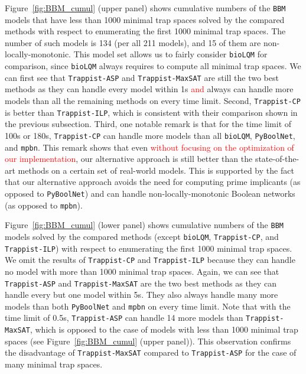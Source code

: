 \documentclass[preprint,12pt]{elsarticle}
\newcommand{\change}[1]{\textcolor{red}{#1}}
\begin{document}
Figure~\ref{fig:BBM_cumul} (upper panel) shows cumulative numbers of the \texttt{BBM} models that have less than 1000 minimal trap spaces solved by the compared methods with respect to enumerating the first 1000 minimal trap spaces.
The number of such models is 134 (per all 211 models), and 15 of them are non-locally-monotonic.
This model set allows us to fairly consider \texttt{bioLQM} for comparison, since \texttt{bioLQM} always requires to compute all minimal trap spaces.
We can first see that \texttt{Trappist-ASP} and \texttt{Trappist-MaxSAT} are still the two best methods as they can handle every model within 1s \change{and} always can handle more models than all the remaining methods on every time limit.
Second, \texttt{Trappist-CP} is better than \texttt{Trappist-ILP}, which is consistent with their comparison shown in the previous subsection.
Third, one notable remark is that for the time limit of 100s or 180s, \texttt{Trappist-CP} can handle more models than all \texttt{bioLQM}, \texttt{PyBoolNet}, and \texttt{mpbn}.
This remark shows that even \change{without focusing on the optimization of our implementation}, our alternative approach is still better than the state-of-the-art methods on a certain set of real-world models.
This is supported by the fact that our alternative approach avoids the need for computing prime implicants (as opposed to \texttt{PyBoolNet}) and can handle non-locally-monotonic Boolean networks (as opposed to \texttt{mpbn}).


Figure~\ref{fig:BBM_cumul} (lower panel) shows cumulative numbers of the \texttt{BBM} models solved by the compared methods (except \texttt{bioLQM}, \texttt{Trappist-CP}, and \texttt{Trappist-ILP}) with respect to enumerating the first 1000 minimal trap spaces.
We omit the results of \texttt{Trappist-CP} and \texttt{Trappist-ILP} because they can handle no model with more than 1000 minimal trap spaces.
Again, we can see that \texttt{Trappist-ASP} and \texttt{Trappist-MaxSAT} are the two best methods as they can handle every but one model within 5s. They also always handle many more models than both \texttt{PyBoolNet} and \texttt{mpbn} on every time limit.
Note that with the time limit of 0.5s, \texttt{Trappist-ASP} can handle 14 more models than \texttt{Trappist-MaxSAT}, which is opposed to the case of models with less than 1000 minimal trap spaces (see Figure~\ref{fig:BBM_cumul} (upper panel)).
This observation confirms the disadvantage of \texttt{Trappist-MaxSAT} compared to \texttt{Trappist-ASP} for the case of many minimal trap spaces.
\end{document}
